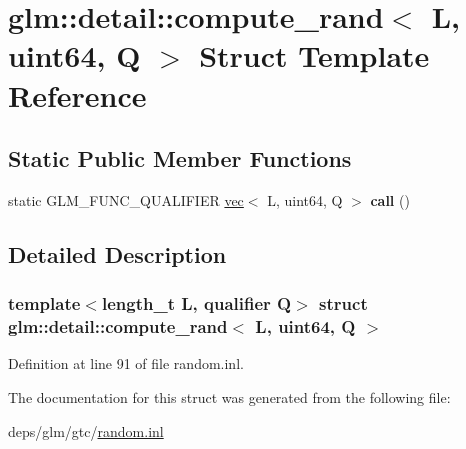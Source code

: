 \hypertarget{structglm_1_1detail_1_1compute__rand_3_01L_00_01uint64_00_01Q_01_4}{}\section{glm\+:\+:detail\+:\+:compute\+\_\+rand$<$ L, uint64, Q $>$ Struct Template Reference}
\label{structglm_1_1detail_1_1compute__rand_3_01L_00_01uint64_00_01Q_01_4}
\subsection*{Static Public Member Functions}
\begin{DoxyCompactItemize}
\item 
\mbox{\label{structglm_1_1detail_1_1compute__rand_3_01L_00_01uint64_00_01Q_01_4_a2191af23ff15cf401dcc9219cb012723}} 
static G\+L\+M\+\_\+\+F\+U\+N\+C\+\_\+\+Q\+U\+A\+L\+I\+F\+I\+ER \hyperlink{structglm_1_1vec}{vec}$<$ L, uint64, Q $>$ {\bfseries call} ()
\end{DoxyCompactItemize}


\subsection{Detailed Description}
\subsubsection*{template$<$length\+\_\+t L, qualifier Q$>$\newline
struct glm\+::detail\+::compute\+\_\+rand$<$ L, uint64, Q $>$}



Definition at line 91 of file random.\+inl.



The documentation for this struct was generated from the following file\+:\begin{DoxyCompactItemize}
\item 
deps/glm/gtc/\hyperlink{random_8inl}{random.\+inl}\end{DoxyCompactItemize}
